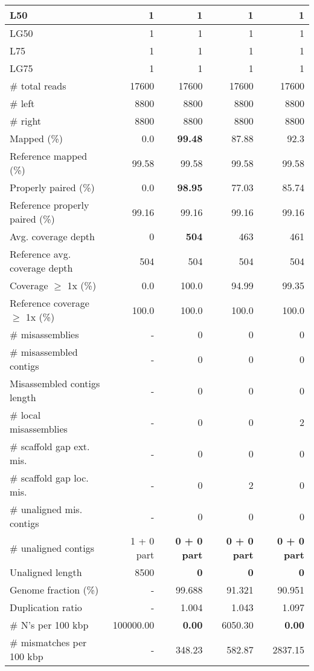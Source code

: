 \documentclass[12pt,a4paper]{article}
\begin{document}
\begin{table}[ht]
\begin{center}
\begin{tabular}{|l*{4}{|r}|}
L50 & 1 & 1 & 1 & 1 \\ \hline
LG50 & 1 & 1 & 1 & 1 \\ \hline
L75 & 1 & 1 & 1 & 1 \\ \hline
LG75 & 1 & 1 & 1 & 1 \\ \hline
\# total reads & 17600 & 17600 & 17600 & 17600 \\ \hline
\# left & 8800 & 8800 & 8800 & 8800 \\ \hline
\# right & 8800 & 8800 & 8800 & 8800 \\ \hline
Mapped (\%) & 0.0 & {\bf 99.48} & 87.88 & 92.3 \\ \hline
Reference mapped (\%) & 99.58 & 99.58 & 99.58 & 99.58 \\ \hline
Properly paired (\%) & 0.0 & {\bf 98.95} & 77.03 & 85.74 \\ \hline
Reference properly paired (\%) & 99.16 & 99.16 & 99.16 & 99.16 \\ \hline
Avg. coverage depth & 0 & {\bf 504} & 463 & 461 \\ \hline
Reference avg. coverage depth & 504 & 504 & 504 & 504 \\ \hline
Coverage $\geq$ 1x (\%) & 0.0 & 100.0 & 94.99 & 99.35 \\ \hline
Reference coverage $\geq$ 1x (\%) & 100.0 & 100.0 & 100.0 & 100.0 \\ \hline
\# misassemblies & - & 0 & 0 & 0 \\ \hline
\# misassembled contigs & - & 0 & 0 & 0 \\ \hline
Misassembled contigs length & - & 0 & 0 & 0 \\ \hline
\# local misassemblies & - & 0 & 0 & 2 \\ \hline
\# scaffold gap ext. mis. & - & 0 & 0 & 0 \\ \hline
\# scaffold gap loc. mis. & - & 0 & 2 & 0 \\ \hline
\# unaligned mis. contigs & - & 0 & 0 & 0 \\ \hline
\# unaligned contigs & 1 + 0 part & {\bf 0 + 0 part} & {\bf 0 + 0 part} & {\bf 0 + 0 part} \\ \hline
Unaligned length & 8500 & {\bf 0} & {\bf 0} & {\bf 0} \\ \hline
Genome fraction (\%) & - & 99.688 & 91.321 & 90.951 \\ \hline
Duplication ratio & - & 1.004 & 1.043 & 1.097 \\ \hline
\# N's per 100 kbp & 100000.00 & {\bf 0.00} & 6050.30 & {\bf 0.00} \\ \hline
\# mismatches per 100 kbp & - & 348.23 & 582.87 & 2837.15 \\ \hline

\end{tabular}
\end{center}
\end{table}
\end{document}
